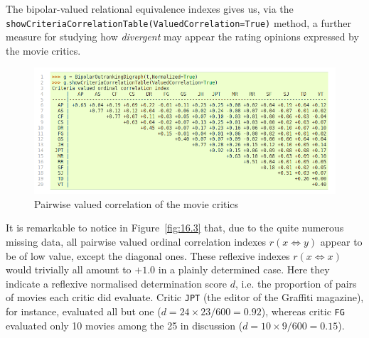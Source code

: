 The bipolar-valued relational equivalence indexes gives us, via the \texttt{showCrite\-riaCorrelationTable(ValuedCorrelation=True)} method, a further measure for studying how \emph{divergent} may appear the rating opinions expressed by the movie critics. 
\begin{figure}[ht]
\includegraphics[width=\hsize]{Figures/16-3-correlationTable.png}
\caption{Pairwise valued correlation of the movie critics} 
\label{fig:16.3}       %
\end{figure}

It is remarkable to notice in Figure~\vref{fig:16.3} that, due to the quite numerous missing data, all pairwise valued ordinal correlation indexes $r(x\Leftrightarrow y)$ appear to be of low value, except the diagonal ones. These reflexive indexes $r(x\Leftrightarrow x)$ would trivially all amount to $+1.0$ in a plainly determined case. Here they indicate a reflexive normalised determination score $d$, i.e. the proportion of pairs of movies each critic did evaluate. Critic \texttt{JPT} (the editor of the Graffiti magazine), for instance, evaluated all but one ($d = 24\times23/600 = 0.92$), whereas critic \texttt{FG} evaluated only 10 movies among the 25 in discussion ($d = 10\times9/600 = 0.15$).

